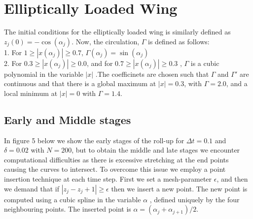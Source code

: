 \documentclass[12pt,twoside]{article}
\begin{document}
\section{Elliptically Loaded Wing}
The initial conditions for the elliptically loaded wing is similarly defined as $z_j(0)=-\cos(\alpha_j)$.
Now, the circulation, $\Gamma$ is defined as follows:
\\1. For $1\ge{|x(\alpha_j)|}\ge{0.7}$, $\Gamma(\alpha_j)=\sin(\alpha_j)$
\\2. For $0.3\ge{|x(\alpha_j)|}\ge{0.0}$, and for $0.7\ge{|x(\alpha_j)|}\ge{0.3}$ , $\Gamma$ is a cubic polynomial in the variable $|x|$ .The coefficinets are chosen such that $\Gamma$ and $\Gamma'$ are continuous and that there is a global maximum at $|x|=0.3$, with $\Gamma=2.0$, and a local minimum at $|x|=0$ with $\Gamma=1.4$. 
\subsection{Early and Middle stages}
In figure 5 below we show the early stages of the roll-up for $\Delta t=0.1$ and $\delta=0.02$ with $N=200$, but to obtain the middle and late stages we encounter computational difficulties as there is excessive stretching at the end points causing the curves to intersect. To overcome this issue we employ a point insertion technique at each time step. First we set a mesh-parameter $\epsilon$, and then we demand that if $|z_j-z_j+1|\ge{\epsilon}$ then we insert a new point. The new point is computed using a cubic spline in the variable $\alpha$ , defined uniquely by the four neighbouring points. The inserted point is $\alpha=(\alpha_j + \alpha_{j+1})/2$. 
\end{document}
